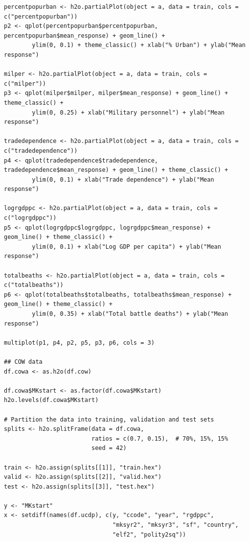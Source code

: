 \documentclass[a4paper,12pt]{article}
\begin{document}
\begin{verbatim}
percentpopurban <- h2o.partialPlot(object = a, data = train, cols = c("percentpopurban"))
p2 <- qplot(percentpopurban$percentpopurban, percentpopurban$mean_response) + geom_line() +
        ylim(0, 0.1) + theme_classic() + xlab("% Urban") + ylab("Mean response")

milper <- h2o.partialPlot(object = a, data = train, cols = c("milper"))
p3 <- qplot(milper$milper, milper$mean_response) + geom_line() + theme_classic() +
        ylim(0, 0.25) + xlab("Military personnel") + ylab("Mean response")

tradedependence <- h2o.partialPlot(object = a, data = train, cols = c("tradedependence"))
p4 <- qplot(tradedependence$tradedependence, tradedependence$mean_response) + geom_line() + theme_classic() +
        ylim(0, 0.1) + xlab("Trade dependence") + ylab("Mean response")

logrgdppc <- h2o.partialPlot(object = a, data = train, cols = c("logrgdppc"))
p5 <- qplot(logrgdppc$logrgdppc, logrgdppc$mean_response) + geom_line() + theme_classic() +
        ylim(0, 0.1) + xlab("Log GDP per capita") + ylab("Mean response")

totalbeaths <- h2o.partialPlot(object = a, data = train, cols = c("totalbeaths"))
p6 <- qplot(totalbeaths$totalbeaths, totalbeaths$mean_response) + geom_line() + theme_classic() +
        ylim(0, 0.35) + xlab("Total battle deaths") + ylab("Mean response")

multiplot(p1, p4, p2, p5, p3, p6, cols = 3)

## COW data
df.cowa <- as.h2o(df.cow)

df.cowa$MKstart <- as.factor(df.cowa$MKstart)
h2o.levels(df.cowa$MKstart)

# Partition the data into training, validation and test sets
splits <- h2o.splitFrame(data = df.cowa, 
                         ratios = c(0.7, 0.15),  # 70%, 15%, 15%
                         seed = 42) 

train <- h2o.assign(splits[[1]], "train.hex")   
valid <- h2o.assign(splits[[2]], "valid.hex") 
test <- h2o.assign(splits[[3]], "test.hex")

y <- "MKstart"
x <- setdiff(names(df.ucdp), c(y, "ccode", "year", "rgdppc",
                               "mksyr2", "mksyr3", "sf", "country",
                               "elf2", "polity2sq")) 


\end{verbatim}
\end{document}
